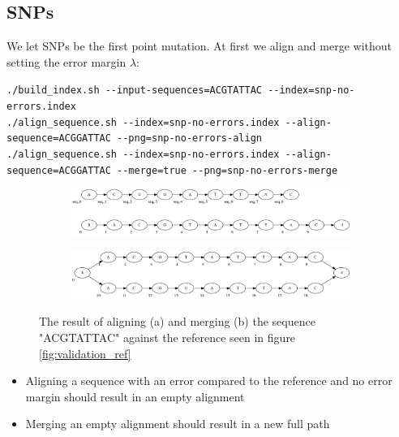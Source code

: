 \documentclass[thesis.tex]{subfiles}
\begin{document}
\subsection*{SNPs}
We let SNPs be the first point mutation. At first we align and merge without setting the error margin $\lambda$:\\
\par\noindent
\texttt{./build\_index.sh -{}-input-sequences=ACGTATTAC -{}-index=snp-no-errors.index}\\
\texttt{./align\_sequence.sh -{}-index=snp-no-errors.index -{}-align-sequence=ACGGATTAC -{}-png=snp-no-errors-align}\\
\texttt{./align\_sequence.sh -{}-index=snp-no-errors.index -{}-align-sequence=ACGGATTAC -{}-merge=true -{}-png=snp-no-errors-merge}\\
\begin{figure}[!h]
  \begin{mdframed}
  \begin{subfigure}[t]{\textwidth}
    \begin{mdframed}
      \includegraphics[width=\textwidth]{output/snp-no-errors-align.png}
    \end{mdframed}
    \subcaption{}
  \end{subfigure}
  \begin{subfigure}[t]{\textwidth}
    \begin{mdframed}
      \includegraphics[width=\textwidth]{output/snp-no-errors-merge.png}
    \end{mdframed}
    \subcaption{}
  \end{subfigure}
  \end{mdframed}
  \caption{The result of aligning (a) and merging (b) the sequence "ACGTATTAC" against the reference seen in figure \ref{fig:validation_ref}}
  \label{fig:validation_snp_no_error}
\end{figure}
\begin{itemize}
\item Aligning a sequence with an error compared to the reference and no error margin should result in an empty alignment
\item Merging an empty alignment should result in a new full path
\end{itemize}
\end{document}
